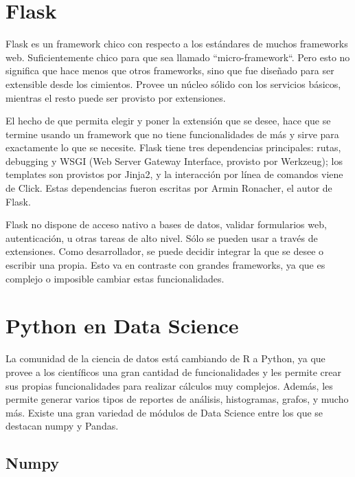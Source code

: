 \section[Flask]{Flask}

Flask es un framework chico con respecto a los estándares de muchos frameworks web. Suficientemente chico para que sea llamado “micro-framework“\cite{Fsck}. Pero esto no significa que hace menos que otros frameworks, sino que fue diseñado para ser extensible desde los cimientos. Provee un núcleo sólido con los servicios básicos, mientras el resto puede ser provisto por extensiones. 

El hecho de que permita elegir y poner la extensión que se desee, hace que se termine usando un framework que no tiene funcionalidades de más y sirve para exactamente lo que se necesite.
Flask tiene tres dependencias principales: rutas, debugging y WSGI (Web Server Gateway Interface, provisto por Werkzeug); los templates son provistos por Jinja2, y la interacción por línea de comandos viene de Click. Estas dependencias fueron escritas por Armin Ronacher, el autor de Flask.

Flask no dispone de acceso nativo a bases de datos, validar formularios web, autenticación, u otras tareas de alto nivel. Sólo se pueden usar a través de extensiones. Como desarrollador, se puede decidir integrar la que se desee o escribir una propia. Esto va en contraste con grandes frameworks, ya que es complejo o imposible cambiar estas funcionalidades.

\section[Python en Data Science]{Python en Data Science}

La comunidad de la ciencia de datos está cambiando de R a Python, ya que provee a los científicos una gran cantidad de funcionalidades y les permite crear sus propias funcionalidades para realizar cálculos muy complejos. Además, les permite generar varios tipos de reportes de análisis, histogramas, grafos, y mucho más.
Existe una gran variedad de módulos de Data Science entre los que se destacan numpy y Pandas.

\subsection[Numpy]{Numpy}

